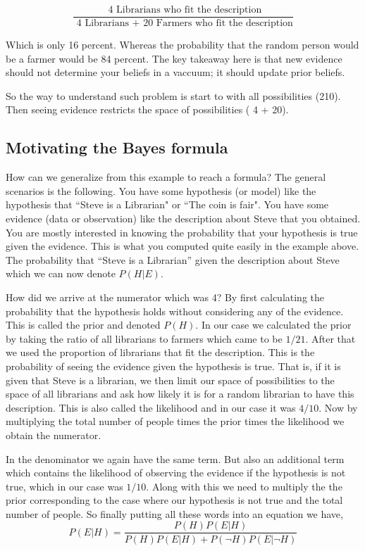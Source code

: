\documentclass{../template/texnote}
\begin{document}
$$\frac{\textrm{ 4 Librarians who fit the description}}{\textrm{ 4 
 Librarians + 20 Farmers who fit the description}}$$

 Which is only 16 percent. Whereas the probability that the random person would be a farmer would be 84 percent.
 The key takeaway here is that new evidence should not determine your beliefs in a vaccuum; it should update prior beliefs.

 So the way to understand such problem is start to with all possibilities (210).
 Then seeing evidence restricts the space of possibilities ( 4 + 20).

\subsection{Motivating the Bayes formula}
 How can we generalize from this example to reach a formula?
 The general scenarios is the following. You have some hypothesis (or model) like the hypothesis that ``Steve is a Librarian" or ``The coin is fair".
 You have some evidence (data or observation) like the description about Steve that you obtained.
 You are mostly interested in knowing the probability that your hypothesis is true given the evidence. This is what you computed quite easily in the example above. The probability that ``Steve is a Librarian'' given the description about Steve which we can now denote $P (H|E)$.

 How did we arrive at the numerator which was 4? By first calculating the probability that the hypothesis holds without considering any of the evidence. This is called the prior and denoted $P(H)$. In our case we calculated the prior by taking the ratio of all librarians to farmers which came to be $1/21$.  
 After that we used the proportion of librarians that fit the description.
 This is the probability of seeing the evidence given the hypothesis is true.
 That is, if it is given that Steve is a librarian, we then limit our space of possibilities to the space of all librarians and ask how likely it is for a random librarian to have this description.
 This is also called the likelihood and in our case it was $4/10$.
 Now by multiplying the total number of people times the prior times the likelihood we obtain the numerator.

 In the denominator we again have the same term. But also an additional term which contains the likelihood of observing the evidence if the hypothesis is not true, which in our case was $1/10$.
 Along with this we need to multiply the the prior corresponding to the case where our hypothesis is not true and the total number of people.
 So finally putting all these words into an equation we have, 
 $$ P(E|H) = \frac{P(H)P(E|H)}{P(H)P(E|H)+P(\neg H)P(E|\neg H)}$$
\end{document}
